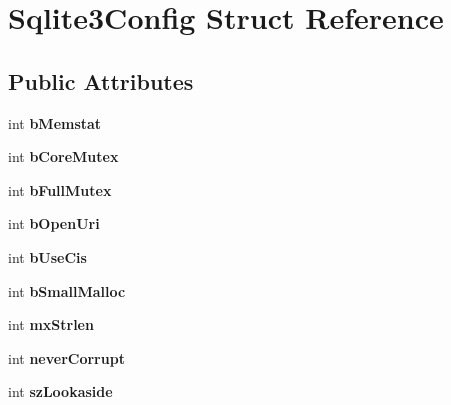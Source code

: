 \hypertarget{struct_sqlite3_config}{}\section{Sqlite3\+Config Struct Reference}
\label{struct_sqlite3_config}
\subsection*{Public Attributes}
\begin{DoxyCompactItemize}
\item 
\mbox{\label{struct_sqlite3_config_aae01de5f37a66422f2a7413e108e03fe}} 
int {\bfseries b\+Memstat}
\item 
\mbox{\label{struct_sqlite3_config_a202216a82e0823d0a4629c4884215a54}} 
int {\bfseries b\+Core\+Mutex}
\item 
\mbox{\label{struct_sqlite3_config_aab880bf54370cd0f6210afce0fb646ee}} 
int {\bfseries b\+Full\+Mutex}
\item 
\mbox{\label{struct_sqlite3_config_af446c9f0657e5564b4dbba3421ffc8be}} 
int {\bfseries b\+Open\+Uri}
\item 
\mbox{\label{struct_sqlite3_config_a3eb3eb5fe14358aba2a6e0083f29d807}} 
int {\bfseries b\+Use\+Cis}
\item 
\mbox{\label{struct_sqlite3_config_a87fb14524f63e413283cac99e8feb502}} 
int {\bfseries b\+Small\+Malloc}
\item 
\mbox{\label{struct_sqlite3_config_a66f1f85ec9b7724f7fe0bebad61a634f}} 
int {\bfseries mx\+Strlen}
\item 
\mbox{\label{struct_sqlite3_config_a6dc51cea630491a7c0694c1547894f1f}} 
int {\bfseries never\+Corrupt}
\item 
\mbox{\label{struct_sqlite3_config_ad7504c4c1867db9837b40d7c22ba7582}} 
int {\bfseries sz\+Lookaside}
\item 
\mbox{\label{struct_sqlite3_config_a2519388eb9688eb3dbdc9b279ee73e0a}} 

\end{DoxyCompactItemize}
